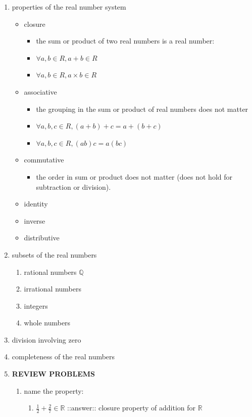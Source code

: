 \documentclass[11pt]{article}
\begin{document}
\begin{enumerate}
\item properties of the real number system
\label{sec:org2528be4}
\begin{itemize}
\item closure
\begin{itemize}
\item the sum or product of two real numbers is a real number:
\item \(\forall a,b \in R, a + b \in R\)
\item \(\forall a,b \in R, a \times b \in R\)
\end{itemize}
\item associative
\begin{itemize}
\item the grouping in the sum or product of real numbers does not matter
\item \(\forall a,b,c \in R, (a + b) + c = a + (b + c)\)
\item \(\forall a,b,c \in R, (ab)c = a(bc)\)
\end{itemize}
\item commutative
\begin{itemize}
\item the order in sum or product does not matter (does not hold for subtraction or division).
\end{itemize}
\item identity
\item inverse
\item distributive
\end{itemize}
\item subsets of the real numbers
\label{sec:orga900361}
\begin{enumerate}
\item rational numbers \(\mathbb{Q}\)
\label{sec:org3177be1}
\item irrational numbers
\label{sec:org71efa14}
\item integers
\label{sec:orge8456e4}
\item whole numbers
\label{sec:org2b36135}
\end{enumerate}
\item division involving zero
\label{sec:org89d5de1}
\item completeness of the real numbers
\label{sec:orgffbdb6c}
\item \textbf{REVIEW PROBLEMS}
\label{sec:org7334af5}
\begin{enumerate}
\item name the property:
\label{sec:orgc86c467}
\begin{enumerate}
\item \(\frac{1}{2} +\frac{2}{7} \in \mathbb{R}\)
\label{sec:orgf81b4f6}
::answer:: closure property of addition for \(\mathbb{R}\)
\end{enumerate}
\end{enumerate}
\end{enumerate}
\end{document}
